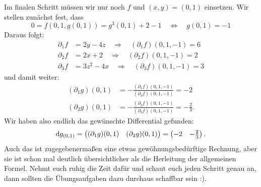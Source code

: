 \begin{Beispiel}
    Im finalen Schritt müssen wir nur noch $f$ und $(x,y)=(0,1)$ einsetzen. Wir stellen zunächst fest, dass
    \begin{equation*}
        0=f(0,1,g(0,1))=g^3(0,1)+2-1 \quad \Leftrightarrow \quad g(0,1)=-1
    \end{equation*}
    Daraus folgt:
    \begin{align*}
        \partial_1 f &= 2y-4z \quad \Rightarrow \quad (\partial_1 f)(0,1,-1)=6 \\
        \partial_2 f &= 2x+2 \quad \Rightarrow \quad (\partial_2 f)(0,1,-1)=2 \\
        \partial_3 f &= 3z^2-4x \quad \Rightarrow \quad (\partial_3 f)(0,1,-1)=3 
    \end{align*}
    und damit weiter:
    \begin{align*}
        (\partial_1 g)(0,1) &= -\frac{(\partial_1 f)(0,1,-1)}{(\partial_3 f)(0,1,-1)} = -2 \\
        (\partial_2 g)(0,1) &= -\frac{(\partial_2 f)(0,1,-1)}{(\partial_3 f)(0,1,-1)} = -\frac{2}{3}.
    \end{align*}
    Wir haben also endlich das gewünschte Differential gefunden:
    \begin{equation*}
        \text{d}g_{(0,1)}=\begin{pmatrix}(\partial_1 g)(0,1) & (\partial_2 g)(0,1)\end{pmatrix} = \begin{pmatrix}-2 & -\frac{2}{3}\end{pmatrix}.
    \end{equation*}
    Auch das ist zugegebenermaßen eine etwas gewöhnungsbedürftige Rechnung, aber sie ist schon mal deutlich übersichtlicher als die Herleitung der allgemeinen Formel. Nehmt euch ruhig die Zeit dafür und schaut euch jeden Schritt genau an, dann sollten die Übungsaufgaben dazu durchaus schaffbar sein :).
\end{Beispiel}

